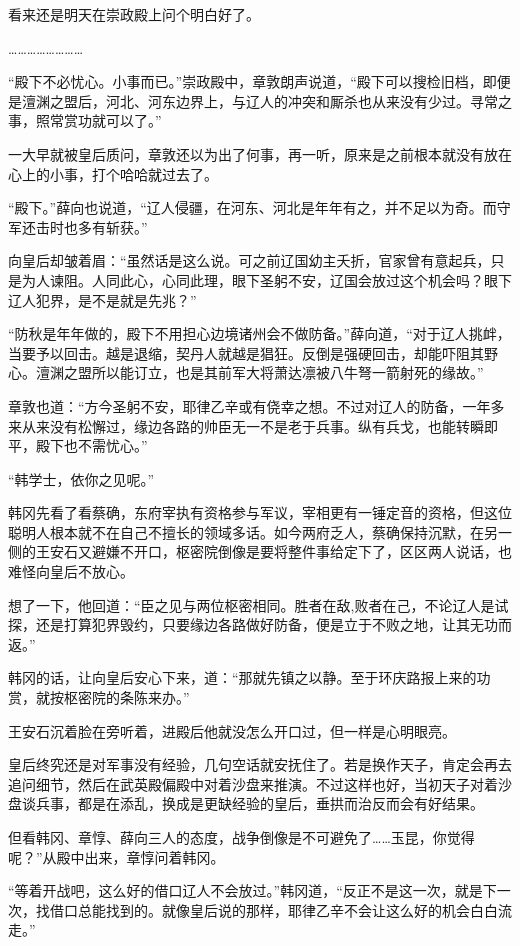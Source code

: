 看来还是明天在崇政殿上问个明白好了。

……………………

“殿下不必忧心。小事而已。”崇政殿中，章敦朗声说道，“殿下可以搜检旧档，即便是澶渊之盟后，河北、河东边界上，与辽人的冲突和厮杀也从来没有少过。寻常之事，照常赏功就可以了。”

一大早就被皇后质问，章敦还以为出了何事，再一听，原来是之前根本就没有放在心上的小事，打个哈哈就过去了。

“殿下。”薛向也说道，“辽人侵疆，在河东、河北是年年有之，并不足以为奇。而守军还击时也多有斩获。”

向皇后却皱着眉：“虽然话是这么说。可之前辽国幼主夭折，官家曾有意起兵，只是为人谏阻。人同此心，心同此理，眼下圣躬不安，辽国会放过这个机会吗？眼下辽人犯界，是不是就是先兆？”

“防秋是年年做的，殿下不用担心边境诸州会不做防备。”薛向道，“对于辽人挑衅，当要予以回击。越是退缩，契丹人就越是猖狂。反倒是强硬回击，却能吓阻其野心。澶渊之盟所以能订立，也是其前军大将萧达凛被八牛弩一箭射死的缘故。”

章敦也道：“方今圣躬不安，耶律乙辛或有侥幸之想。不过对辽人的防备，一年多来从来没有松懈过，缘边各路的帅臣无一不是老于兵事。纵有兵戈，也能转瞬即平，殿下也不需忧心。”

“韩学士，依你之见呢。”

韩冈先看了看蔡确，东府宰执有资格参与军议，宰相更有一锤定音的资格，但这位聪明人根本就不在自己不擅长的领域多话。如今两府乏人，蔡确保持沉默，在另一侧的王安石又避嫌不开口，枢密院倒像是要将整件事给定下了，区区两人说话，也难怪向皇后不放心。

想了一下，他回道：“臣之见与两位枢密相同。胜者在敌,败者在己，不论辽人是试探，还是打算犯界毁约，只要缘边各路做好防备，便是立于不败之地，让其无功而返。”

韩冈的话，让向皇后安心下来，道：“那就先镇之以静。至于环庆路报上来的功赏，就按枢密院的条陈来办。”

王安石沉着脸在旁听着，进殿后他就没怎么开口过，但一样是心明眼亮。

皇后终究还是对军事没有经验，几句空话就安抚住了。若是换作天子，肯定会再去追问细节，然后在武英殿偏殿中对着沙盘来推演。不过这样也好，当初天子对着沙盘谈兵事，都是在添乱，换成是更缺经验的皇后，垂拱而治反而会有好结果。

但看韩冈、章惇、薛向三人的态度，战争倒像是不可避免了……玉昆，你觉得呢？”从殿中出来，章惇问着韩冈。

“等着开战吧，这么好的借口辽人不会放过。”韩冈道，“反正不是这一次，就是下一次，找借口总能找到的。就像皇后说的那样，耶律乙辛不会让这么好的机会白白流走。”

